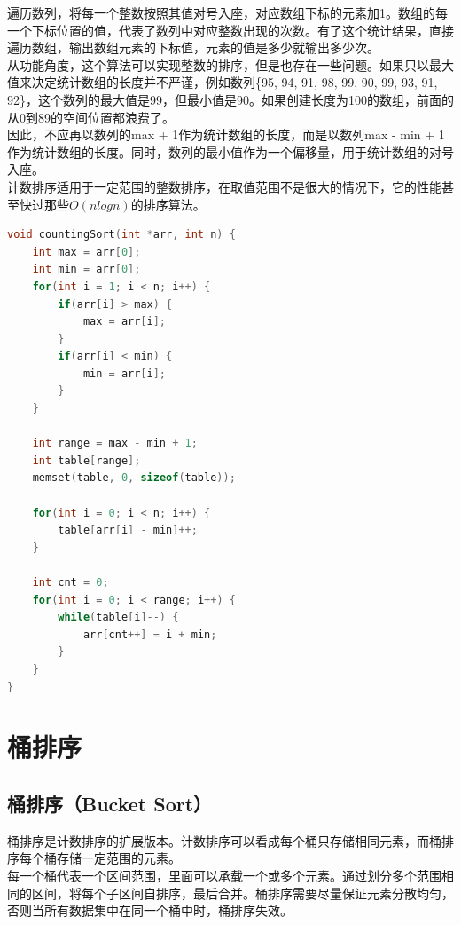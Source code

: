 遍历数列，将每一个整数按照其值对号入座，对应数组下标的元素加1。数组的每一个下标位置的值，代表了数列中对应整数出现的次数。有了这个统计结果，直接遍历数组，输出数组元素的下标值，元素的值是多少就输出多少次。 \\

从功能角度，这个算法可以实现整数的排序，但是也存在一些问题。如果只以最大值来决定统计数组的长度并不严谨，例如数列\{95, 94, 91, 98, 99, 90, 99, 93, 91, 92\}，这个数列的最大值是99，但最小值是90。如果创建长度为100的数组，前面的从0到89的空间位置都浪费了。 \\

因此，不应再以数列的max + 1作为统计数组的长度，而是以数列max - min + 1作为统计数组的长度。同时，数列的最小值作为一个偏移量，用于统计数组的对号入座。 \\

计数排序适用于一定范围的整数排序，在取值范围不是很大的情况下，它的性能甚至快过那些$ O(nlogn) $的排序算法。 \\


\begin{lstlisting}[language=C]
void countingSort(int *arr, int n) {
    int max = arr[0];
    int min = arr[0];
    for(int i = 1; i < n; i++) {
        if(arr[i] > max) {
            max = arr[i];
        }
        if(arr[i] < min) {
            min = arr[i];
        }
    }
    
    int range = max - min + 1;
    int table[range];
    memset(table, 0, sizeof(table));

    for(int i = 0; i < n; i++) {
        table[arr[i] - min]++;
    }

    int cnt = 0;
    for(int i = 0; i < range; i++) {
        while(table[i]--) {
            arr[cnt++] = i + min;
        }
    }
}
\end{lstlisting}

\newpage

\section{桶排序}

\subsection{桶排序（Bucket Sort）}

桶排序是计数排序的扩展版本。计数排序可以看成每个桶只存储相同元素，而桶排序每个桶存储一定范围的元素。 \\

每一个桶代表一个区间范围，里面可以承载一个或多个元素。通过划分多个范围相同的区间，将每个子区间自排序，最后合并。桶排序需要尽量保证元素分散均匀，否则当所有数据集中在同一个桶中时，桶排序失效。

